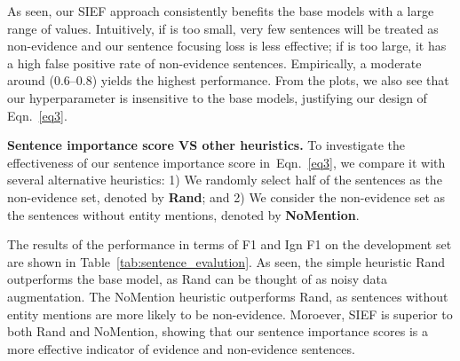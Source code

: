 \documentclass[11pt]{article}
\begin{document}
As seen, our SIEF approach consistently benefits the base models with a large range of  values. Intuitively, if  is too small, very few sentences will be treated as non-evidence and our sentence focusing loss is less effective; if  is too large, it has a high false positive rate of non-evidence sentences. Empirically, a moderate  around (0.6--0.8) yields the highest performance. From the plots, we also see that our hyperparameter  is insensitive to the base models, justifying our design of Eqn.~\eqref{eq3}.

\textbf{Sentence importance score VS other heuristics.}
To investigate the effectiveness of our sentence importance score in~Eqn.~\eqref{eq3}, we compare it with several alternative heuristics: 1) We randomly select half of the sentences as the non-evidence set, denoted by \textbf{Rand}; and 2) We consider the non-evidence set as the sentences without entity mentions, denoted by \textbf{NoMention}.

The results of the performance in terms of F1 and Ign F1 on the development set are shown in Table~\ref{tab:sentence_evalution}.
As seen, the simple heuristic Rand outperforms the base model, as Rand can be thought of as noisy data augmentation. The NoMention heuristic outperforms Rand, as sentences without entity mentions are more likely to be non-evidence. Moroever, SIEF is superior to both Rand and NoMention, showing that our sentence importance scores is a more effective indicator of evidence and non-evidence sentences.

\begin{table}[!t]
\centering
{}
\caption{Results of our approach and other heuristics.}
\label{tab:sentence_evalution}
\end{table}
\end{document}

